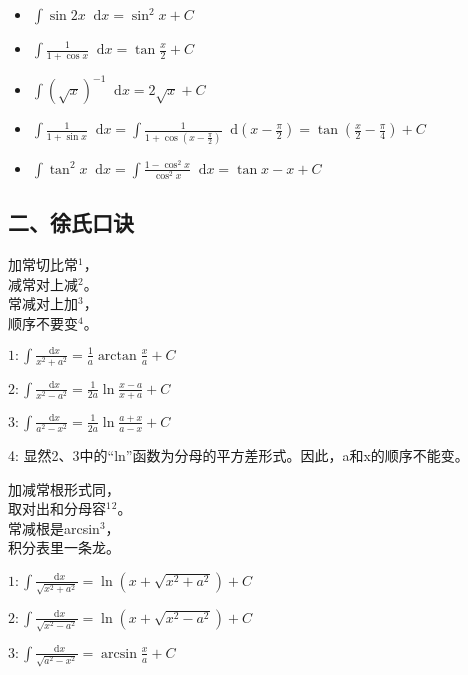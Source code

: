 \documentclass[a5paper]{ctexart}
\renewcommand{\d}{\mathop{}\!\mathrm{d}}
\begin{document}
	\begin{itemize}
		\item $\int \sin 2x  \d x= \sin^2 x + C$
		
		\item $\int \frac{1}{1 + \cos x} \d x = \tan \frac{x}{2} + C$
		
		\item $\int (\sqrt{x})^{-1} \d x = 2 \sqrt{x} + C$
		
		\item $\int \frac{1}{1 + \sin x} \d x = \int \frac{1}{1 + \cos (x - \frac{\pi}{2})} \d (x - \frac{\pi}{2}) = \tan (\frac{x}{2} - \frac{\pi}{4}) + C$
		
		\item $\int \tan ^2 x \d x = \int \frac{1 - \cos^2 x}{\cos ^2 x} \d x = \tan x - x + C$
	\end{itemize}
	
	\subsection*{二、徐氏口诀}
	
	\begin{center}
		加常切比常$^1$，\\
		减常对上减$^2$。\\
		常减对上加$^3$，\\
		顺序不要变$^4$。
	\end{center}
	
	$1: \int \frac{\d x}{x^2 + a^2} = \frac{1}{a} \arctan \frac{x}{a} + C$
	
	$2: \int \frac{\d x}{x^2 - a^2} = \frac{1}{2a} \ln \frac{x - a}{x + a} + C$
	
	$3: \int \frac{\d x}{a^2 - x^2} = \frac{1}{2a} \ln \frac{a + x}{a - x} + C$
	
	4: 显然2、3中的“ln”函数为分母的平方差形式。因此，a和x的顺序不能变。
	
	
	\begin{center}
		加减常根形式同，\\
		取对出和分母容$^1$$^2$。\\
		常减根是arcsin$^3$，\\
		积分表里一条龙。
	\end{center}

	$1: \int \frac{\d x}{\sqrt{x^2 + a^2}} = \ln (x + \sqrt{x^2 + a^2}) + C$
	
	$2: \int \frac{\d x}{\sqrt{x^2 - a^2}} = \ln (x + \sqrt{x^2 - a^2}) + C$
	
	$3: \int \frac{\d x}{\sqrt{a^2 - x^2}} = \arcsin \frac{x}{a} + C$
	
\end{document}
